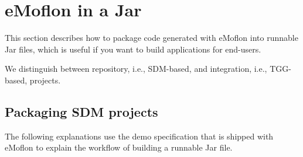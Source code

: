 \newpage
\section{eMoflon in a Jar}
\genHeader

This section describes how to package code generated with eMoflon into
runnable Jar files, which is useful if you want to build applications for end-users.

We distinguish between repository, i.e., SDM-based, and integration,
i.e., TGG-based, projects.

\subsection{Packaging SDM projects}

The following explanations use the demo specification that is shipped with
eMoflon to explain the workflow of building a runnable Jar file.

